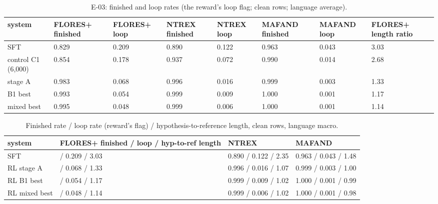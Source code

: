 \begin{table}[t]
\centering\footnotesize
\setlength{\tabcolsep}{4pt}
\caption{E-03: finished and loop rates (the reward's loop flag; clean rows; language average).}\label{tab:e03-finish}
\begin{adjustbox}{max width=\linewidth}\begin{tabular}{@{}llllllll@{}}
\toprule
system & FLORES+ finished & FLORES+ loop & NTREX finished & NTREX loop & MAFAND finished & MAFAND loop & FLORES+ length ratio \\
\midrule
SFT & 0.829 & 0.209 & 0.890 & 0.122 & 0.963 & 0.043 & 3.03 \\
control C1 (6,000) & 0.854 & 0.178 & 0.937 & 0.072 & 0.990 & 0.014 & 2.68 \\
stage A & 0.983 & 0.068 & 0.996 & 0.016 & 0.999 & 0.003 & 1.33 \\
B1 best & 0.993 & 0.054 & 0.999 & 0.009 & 1.000 & 0.001 & 1.17 \\
mixed best & 0.995 & 0.048 & 0.999 & 0.006 & 1.000 & 0.001 & 1.14 \\
\bottomrule
\end{tabular}\end{adjustbox}
\end{table}

\begin{table}[t]
\centering\footnotesize
\setlength{\tabcolsep}{4pt}
\caption{Finished rate / loop rate (reward's flag) / hypothesis-to-reference length, clean rows, language macro.}\label{tab:finish}
\begin{tabularx}{\linewidth}{@{}l>{\raggedright\arraybackslash}Xll@{}}
\toprule
system & FLORES+ finished / loop / hyp-to-ref length & NTREX & MAFAND \\
\midrule
SFT & 0.829 / 0.209 / 3.03 & 0.890 / 0.122 / 2.35 & 0.963 / 0.043 / 1.48 \\
RL stage A & 0.983 / 0.068 / 1.33 & 0.996 / 0.016 / 1.07 & 0.999 / 0.003 / 1.00 \\
RL B1 best & 0.993 / 0.054 / 1.17 & 0.999 / 0.009 / 1.02 & 1.000 / 0.001 / 0.99 \\
RL mixed best & 0.995 / 0.048 / 1.14 & 0.999 / 0.006 / 1.02 & 1.000 / 0.001 / 0.98 \\
\bottomrule
\end{tabularx}
\end{table}

